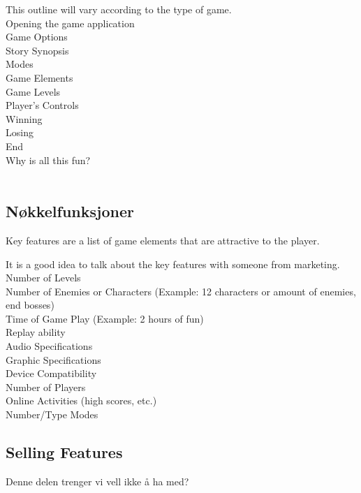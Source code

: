 This outline will vary according to the type of game. \\
Opening the game application\\
Game Options \\
Story Synopsis\\
Modes\\
Game Elements\\
Game Levels\\
Player’s Controls\\
Winning\\
Losing\\
End\\
Why is all this fun?\\
\\

\subsection{Nøkkelfunksjoner}

Key features are a list of game elements that are attractive to the player.

It is a good idea to talk about the key features with someone from marketing.\\
Number of Levels\\
Number of Enemies or Characters (Example: 12 characters or amount of enemies, end bosses)\\
Time of Game Play (Example: 2 hours of fun)\\
Replay ability \\
Audio Specifications\\
Graphic Specifications\\
Device Compatibility\\
Number of Players\\
Online Activities (high scores, etc.)\\
Number/Type Modes

\subsection{Selling Features}

Denne delen trenger vi vell ikke å ha med?






